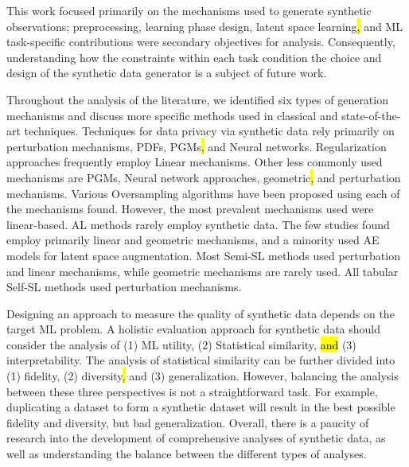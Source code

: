 This work focused primarily on the mechanisms used to generate synthetic
observations; preprocessing, learning phase design, latent space learning\hl{,} and
ML task-specific contributions were secondary objectives for analysis.
Consequently, understanding\hl{ }how the constraints within each task condition
the choice and design of the synthetic data generator is a subject of future
work.

Throughout the analysis of the literature, we identified six types of
generation mechanisms and discuss more specific methods used in classical and
state-of-the-art techniques. Techniques for data privacy via synthetic data
rely primarily on perturbation mechanisms, PDFs, PGMs\hl{,} and Neural networks.
Regularization approaches frequently employ Linear mechanisms. Other less
commonly used mechanisms are PGMs, Neural network approaches, geometric\hl{,} and
perturbation mechanisms. Various Oversampling algorithms have been proposed
using each of the mechanisms found. However, the most prevalent mechanisms
used were linear-based. AL methods rarely employ synthetic data. The few
studies found employ primarily linear and geometric mechanisms, and a minority
used AE models for latent space augmentation. Most Semi-SL methods used
perturbation and linear mechanisms, while geometric mechanisms are rarely
used. All tabular Self-SL methods used perturbation mechanisms. 

Designing an approach to measure the quality of synthetic data depends on the
target ML problem. A\hl{ }holistic evaluation approach for synthetic data should
consider the analysis of (1) ML utility, (2) Statistical similarity, \hl{and} (3)
interpretability. The analysis of statistical similarity can be further
divided into (1) fidelity, (2) diversity\hl{,} and (3) generalization.  However,
balancing the analysis between these three perspectives is not a
straightforward task. For example, duplicating a dataset to form a synthetic
dataset will result in\hl{ }the best possible fidelity and diversity, but bad
generalization. Overall, there is a paucity of research into the development
of comprehensive analyses of synthetic data, as well as understanding the
balance between the different types of analyses.

